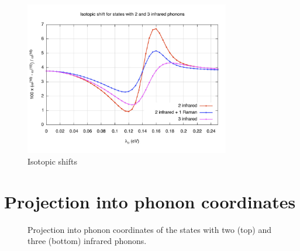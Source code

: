 \begin{figure}[ht!]
  \centering
  \includegraphics[width=0.8\textwidth]{images/isot-2_3ir.jpg}
  \caption{Isotopic shifts}
  \label{fig:isot-2_3ir}
\end{figure}

\section{Projection into phonon coordinates}
\label{sec:irPhononProj}

\begin{figure}
  \centering
  
  \caption{Projection into phonon coordinates of the states with two (top) and three (bottom) infrared phonons.}
  \label{fig:phononProj2-3ir}
\end{figure}
